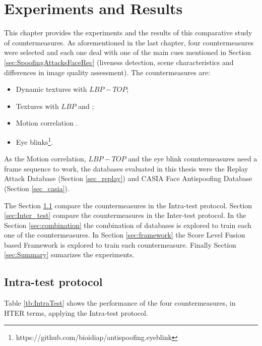 \chapter{Experiments and Results}
\label{chap:Experiments_Results}

This chapter provides the experiments and the results of this comparative study of countermeasures. As aforementioned in the last chapter, four countermeasures were selected and each one deal with one of the main cues mentioned in Section \ref{sec:SpoofingAttacksFaceRec} (liveness detection, scene characteristics and differences in image quality assessment). The countermeasures are:

\begin{itemize}
        \item Dynamic textures with $LBP-TOP$;
        \item Textures with $LBP$ \cite{ChingovskaBIOSIG2012} and \cite{maatta2011face};
        \item Motion correlation \cite{AnjosIJCB2011}.
        \item Eye blinks\footnote{https://github.com/bioidiap/antispoofing.eyeblink}.
\end{itemize}

As the Motion correlation, $LBP-TOP$ and the eye blink countermeasures need a frame sequence to work, the databases evaluated in this thesis were the Replay Attack Database (Section \ref{sec_replay}) and CASIA Face Antispoofing Database (Section \ref{sec_casia}).

The Section \ref{sec:Intra_test} compare the countermeasures in the Intra-test protocol. Section \ref{sec:Inter_test} compare the countermeasures in the Inter-test protocol. In the Section \ref{sec:combination} the combination of databases is explored to train each one of the countermeasures. In Section \ref{sec:framework} the Score Level Fusion based Framework is explored to train each countermeasure. Finally Section \ref{sec:Summary} sumarizes the experiments.

\section{Intra-test protocol}
\label{sec:Intra_test}

Table \ref{tb:IntraTest} shows the performance of the four countermeasures, in HTER terms, applying the Intra-test protocol.

